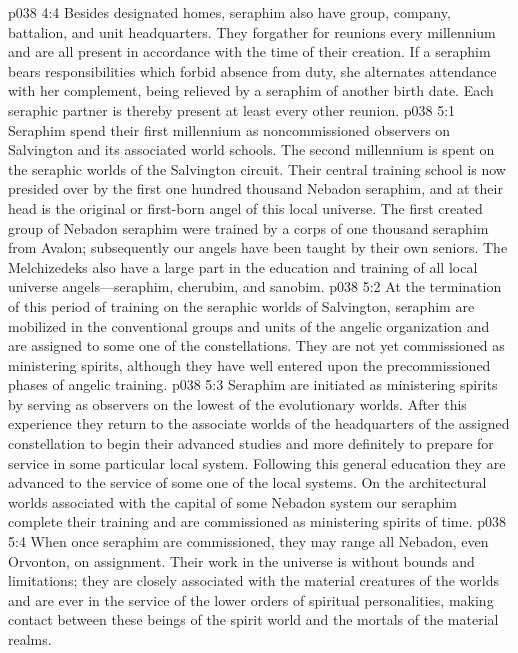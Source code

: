 \vs p038 4:4 Besides designated homes, seraphim also have group, company, battalion, and unit headquarters. They forgather for reunions every millennium and are all present in accordance with the time of their creation. If a seraphim bears responsibilities which forbid absence from duty, she alternates attendance with her complement, being relieved by a seraphim of another birth date. Each seraphic partner is thereby present at least every other reunion.\plusone
{}
\vs p038 5:1 Seraphim spend their first millennium as noncommissioned observers on Salvington and its associated world schools. The second millennium is spent on the seraphic worlds of the Salvington circuit. Their central training school is now presided over by the first one hundred thousand Nebadon seraphim, and at their head is the original or first\hyp{}born angel of this local universe. The first created group of Nebadon seraphim were trained by a corps of one thousand seraphim from Avalon; subsequently our angels have been taught by their own seniors. The Melchizedeks also have a large part in the education and training of all local universe angels---seraphim, cherubim, and sanobim.
\vs p038 5:2 At the termination of this period of training on the seraphic worlds of Salvington, seraphim are mobilized in the conventional groups and units of the angelic organization and are assigned to some one of the constellations. They are not yet commissioned as ministering spirits, although they have well entered upon the precommissioned phases of angelic training.
\vs p038 5:3 Seraphim are initiated as ministering spirits by serving as observers on the lowest of the evolutionary worlds. After this experience they return to the associate worlds of the headquarters of the assigned constellation to begin their advanced studies and more definitely to prepare for service in some particular local system. Following this general education they are advanced to the service of some one of the local systems. On the architectural worlds associated with the capital of some Nebadon system our seraphim complete their training and are commissioned as ministering spirits of time.
\vs p038 5:4 When once seraphim are commissioned, they may range all Nebadon, even Orvonton, on assignment. Their work in the universe is without bounds and limitations; they are closely associated with the material creatures of the worlds and are ever in the service of the lower orders of spiritual personalities, making contact between these beings of the spirit world and the mortals of the material realms.
